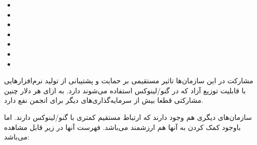 \begin{itemize}
\item
{}

\item
{}

\item
{}

\item
{}

\item
{}

\item
{}

\item 
{}
\end{itemize}

مشارکت در این سازمان‌ها تاثیر مستقیمی بر حمایت و پشتیبانی از تولید
نرم‌افزارهایی با قابلیت توزیع آزاد که در گنو/لینوکس استفاده می‌شوند دارد.
به ازای هر دلار چنین مشارکتی قطعا بیش از سرمایه‌گذاری‌های دیگر برای انجمن نفع دارد.

سازمان‌های دیگری هم وجود دارند که ارتباط مستقیم کمتری با گنو/لینوکس دارند.
اما باوجود کمک کردن به آنها هم ارزشمند می‌باشد. فهرست آنها در زیر قابل مشاهده می‌باشد:

